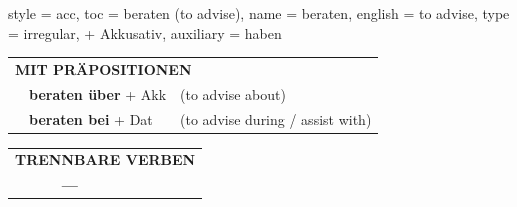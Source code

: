 \begin{verbentry}{
  style = {acc},
  toc = {beraten (to advise)},
  name = {beraten},
  english = {to advise},
  type = {irregular, + Akkusativ},
  auxiliary = {haben}
}
\vspace{10pt}

\begin{tabular}{lll}
\multicolumn{3}{l}{\textbf{MIT PRÄPOSITIONEN}}\\
& \textbf{beraten über} + Akk & (to advise about)\\
& \textbf{beraten bei} + Dat & (to advise during / assist with)\\
\end{tabular}
\hfill
\begin{tabular}{lll}
\multicolumn{3}{l}{\textbf{TRENNBARE VERBEN}}\\
& \textbf{---} & \\
\end{tabular}

\vspace{-5pt}
\end{verbentry}

